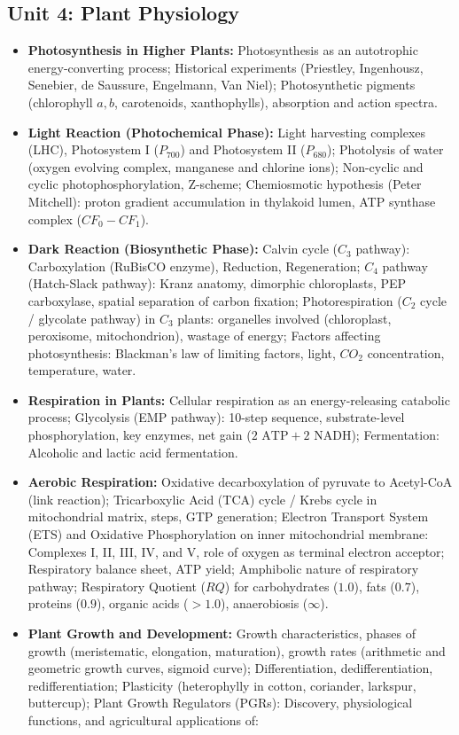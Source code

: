 \documentclass[11pt,a4paper]{article}
\begin{document}
\subsection{Unit 4: Plant Physiology}
\begin{itemize}
  \item \textbf{Photosynthesis in Higher Plants:} Photosynthesis as an autotrophic energy-converting process; Historical experiments (Priestley, Ingenhousz, Senebier, de Saussure, Engelmann, Van Niel); Photosynthetic pigments (chlorophyll $a, b$, carotenoids, xanthophylls), absorption and action spectra.
  \item \textbf{Light Reaction (Photochemical Phase):} Light harvesting complexes (LHC), Photosystem I ($P_{700}$) and Photosystem II ($P_{680}$); Photolysis of water (oxygen evolving complex, manganese and chlorine ions); Non-cyclic and cyclic photophosphorylation, Z-scheme; Chemiosmotic hypothesis (Peter Mitchell): proton gradient accumulation in thylakoid lumen, ATP synthase complex ($CF_0-CF_1$).
  \item \textbf{Dark Reaction (Biosynthetic Phase):} Calvin cycle ($C_3$ pathway): Carboxylation (RuBisCO enzyme), Reduction, Regeneration; $C_4$ pathway (Hatch-Slack pathway): Kranz anatomy, dimorphic chloroplasts, PEP carboxylase, spatial separation of carbon fixation; Photorespiration ($C_2$ cycle / glycolate pathway) in $C_3$ plants: organelles involved (chloroplast, peroxisome, mitochondrion), wastage of energy; Factors affecting photosynthesis: Blackman's law of limiting factors, light, $CO_2$ concentration, temperature, water.
  \item \textbf{Respiration in Plants:} Cellular respiration as an energy-releasing catabolic process; Glycolysis (EMP pathway): 10-step sequence, substrate-level phosphorylation, key enzymes, net gain ($2\text{ ATP} + 2\text{ NADH}$); Fermentation: Alcoholic and lactic acid fermentation.
  \item \textbf{Aerobic Respiration:} Oxidative decarboxylation of pyruvate to Acetyl-CoA (link reaction); Tricarboxylic Acid (TCA) cycle / Krebs cycle in mitochondrial matrix, steps, GTP generation; Electron Transport System (ETS) and Oxidative Phosphorylation on inner mitochondrial membrane: Complexes I, II, III, IV, and V, role of oxygen as terminal electron acceptor; Respiratory balance sheet, ATP yield; Amphibolic nature of respiratory pathway; Respiratory Quotient ($RQ$) for carbohydrates ($1.0$), fats ($0.7$), proteins ($0.9$), organic acids ($>1.0$), anaerobiosis ($ \infty $).
  \item \textbf{Plant Growth and Development:} Growth characteristics, phases of growth (meristematic, elongation, maturation), growth rates (arithmetic and geometric growth curves, sigmoid curve); Differentiation, dedifferentiation, redifferentiation; Plasticity (heterophylly in cotton, coriander, larkspur, buttercup); Plant Growth Regulators (PGRs): Discovery, physiological functions, and agricultural applications of:

\end{itemize}
\end{document}
